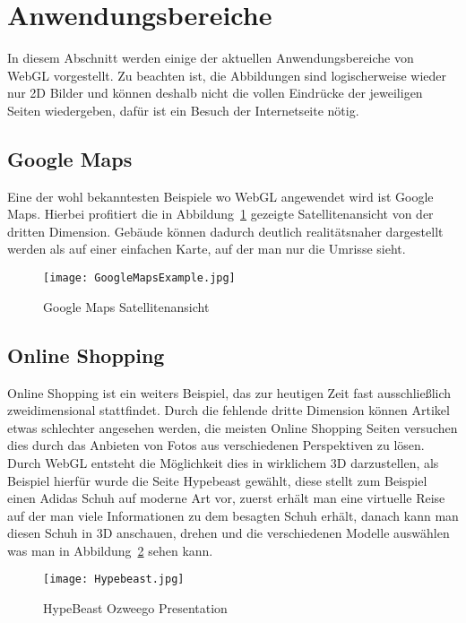 \section{Anwendungsbereiche}
\label{sec:usecases}
In diesem Abschnitt werden einige der aktuellen Anwendungsbereiche von WebGL vorgestellt.
Zu beachten ist, die Abbildungen sind logischerweise wieder nur 2D Bilder und können deshalb nicht die vollen Eindrücke der jeweiligen Seiten wiedergeben, dafür ist ein Besuch der Internetseite nötig.
\subsection{Google Maps}
Eine der wohl bekanntesten Beispiele wo WebGL angewendet wird ist Google Maps.
Hierbei profitiert die in Abbildung~\ref{fig:GoogleMaps} gezeigte Satellitenansicht von der dritten Dimension.
Gebäude können dadurch deutlich realitätsnaher dargestellt werden als auf einer einfachen Karte, auf der man nur die Umrisse sieht.
\begin{figure}
    \centering
    \texttt{[image: GoogleMapsExample.jpg]}
    \caption{Google Maps Satellitenansicht \cite{GoogleMaps}} \label{fig:GoogleMaps}
    \end{figure}

\subsection{Online Shopping}
Online Shopping ist ein weiters Beispiel, das zur heutigen Zeit fast ausschließlich zweidimensional stattfindet.
Durch die fehlende dritte Dimension können Artikel etwas schlechter angesehen werden, die meisten Online Shopping Seiten versuchen dies durch das Anbieten von Fotos aus verschiedenen Perspektiven zu lösen.
Durch WebGL entsteht die Möglichkeit dies in wirklichem 3D darzustellen, als Beispiel hierfür wurde die Seite Hypebeast gewählt, diese stellt zum Beispiel einen Adidas Schuh auf moderne Art vor, zuerst erhält man eine virtuelle Reise auf der man viele Informationen zu dem besagten Schuh erhält, danach kann man diesen Schuh in 3D anschauen, drehen und die verschiedenen Modelle auswählen was man in Abbildung~\ref{fig:HypeBeast} sehen kann.
\begin{figure}
    \centering
    \texttt{[image: Hypebeast.jpg]}
    \caption{HypeBeast Ozweego Presentation \cite{hypbeast}} \label{fig:HypeBeast}
    \end{figure}


